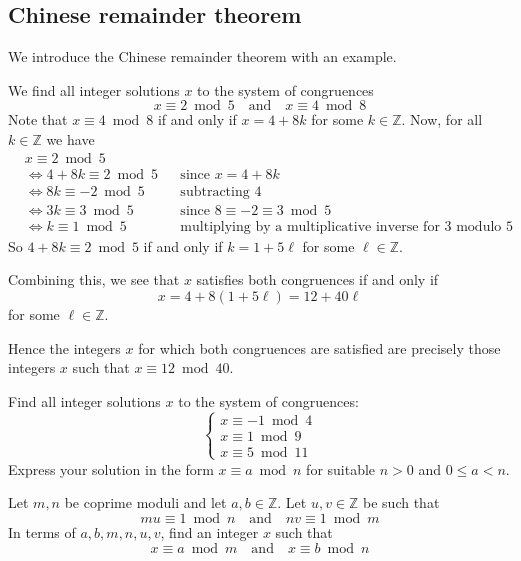 \subsection*{Chinese remainder theorem}

We introduce the Chinese remainder theorem with an example.

\begin{example}
We find all integer solutions $x$ to the system of congruences
\[ x \equiv 2 \bmod 5 \quad \text{and} \quad x \equiv 4 \bmod 8 \]
Note that $x \equiv 4 \bmod 8$ if and only if $x = 4+8k$ for some $k \in \mathbb{Z}$. Now, for all $k \in \mathbb{Z}$ we have
\begin{align*}
&x \equiv 2 \bmod 5 && \\
&\Leftrightarrow 4+8k \equiv 2 \bmod 5 && \text{since } x=4+8k \\
&\Leftrightarrow 8k \equiv -2 \bmod 5 && \text{subtracting $4$} \\
&\Leftrightarrow 3k \equiv 3 \bmod 5 && \text{since $8 \equiv -2 \equiv 3 \bmod 5$} \\
&\Leftrightarrow k \equiv 1 \bmod 5 && \text{multiplying by a multiplicative inverse for $3$ modulo $5$}
\end{align*}
So $4+8k \equiv 2 \bmod 5$ if and only if $k = 1 + 5\ell$ for some $\ell \in \mathbb{Z}$.

Combining this, we see that $x$ satisfies both congruences if and only if
\[ x = 4+8(1+5\ell) = 12+40\ell \]
for some $\ell \in \mathbb{Z}$.

Hence the integers $x$ for which both congruences are satisfied are precisely those integers $x$ such that $x \equiv 12 \bmod{40}$.
\end{example}

\begin{exercise}
Find all integer solutions $x$ to the system of congruences:
\[ \begin{cases}
x \equiv {-1} \bmod 4 \\
x \equiv 1 \bmod 9 \\
x \equiv 5 \bmod{11}
\end{cases} \]
Express your solution in the form $x \equiv a \bmod n$ for suitable $n > 0$ and $0 \le a < n$.
\end{exercise}

\begin{exercise}
\label{exCRTExistence}
Let $m,n$ be coprime moduli and let $a,b \in \mathbb{Z}$. Let $u,v \in \mathbb{Z}$ be such that
\[ mu \equiv 1 \bmod n \quad \text{and} \quad nv \equiv 1 \bmod m \]
In terms of $a,b,m,n,u,v$, find an integer $x$ such that
\[ x \equiv a \bmod m \quad \text{and} \quad x \equiv b \bmod n \]
\end{exercise}


